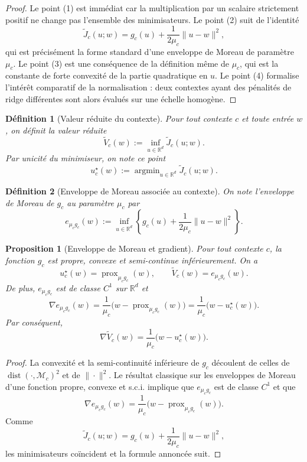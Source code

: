 \documentclass[11pt,a4paper]{article}
\newtheorem{definition}{Définition}[section]
\newtheorem{proposition}{Proposition}[section]
\DeclareMathOperator{\prox}{prox}
\DeclareMathOperator{\argmin}{argmin}
\DeclareMathOperator{\dist}{dist}
\newcommand{\R}{\mathbb R}
\newcommand{\Mcal}{\mathcal M}
\begin{document}
\begin{proof}
Le point (1) est immédiat car la multiplication par un scalaire strictement positif ne change pas l'ensemble des minimisateurs. Le point (2) suit de l'identité
\[
\widetilde J_c(u;w)=g_c(u)+\frac{1}{2\mu_c}\|u-w\|^2,
\]
qui est précisément la forme standard d'une enveloppe de Moreau de paramètre \(\mu_c\). Le point (3) est une conséquence de la définition même de \(\mu_c\), qui est la constante de forte convexité de la partie quadratique en \(u\). Le point (4) formalise l'intérêt comparatif de la normalisation : deux contextes ayant des pénalités de ridge différentes sont alors évalués sur une échelle homogène.
\end{proof}

\begin{definition}[Valeur réduite du contexte]
Pour tout contexte \(c\) et toute entrée \(w\), on définit la valeur réduite
\[
\widetilde V_c(w)
:=
\inf_{u\in\R^d}\widetilde J_c(u;w).
\]
Par unicité du minimiseur, on note ce point
\[
u_c^\star(w):=\argmin_{u\in\R^d}\widetilde J_c(u;w).
\]
\end{definition}

\begin{definition}[Enveloppe de Moreau associée au contexte]
On note l'enveloppe de Moreau de \(g_c\) au paramètre \(\mu_c\) par
\[
e_{\mu_c g_c}(w)
:=
\inf_{u\in\R^d}
\left\{
g_c(u)+\frac{1}{2\mu_c}\|u-w\|^2
\right\}.
\]
\end{definition}

\begin{proposition}[Enveloppe de Moreau et gradient]
Pour tout contexte \(c\), la fonction \(g_c\) est propre, convexe et semi-continue inférieurement. On a
\[
u_c^\star(w)=\prox_{\mu_c g_c}(w),
\qquad
\widetilde V_c(w)=e_{\mu_c g_c}(w).
\]
De plus, \(e_{\mu_c g_c}\) est de classe \(C^1\) sur \(\R^d\) et
\[
\nabla e_{\mu_c g_c}(w)=\frac{1}{\mu_c}\bigl(w-\prox_{\mu_c g_c}(w)\bigr)
=\frac{1}{\mu_c}\bigl(w-u_c^\star(w)\bigr).
\]
Par conséquent,
\[
\nabla \widetilde V_c(w)=\frac{1}{\mu_c}\bigl(w-u_c^\star(w)\bigr).
\]
\end{proposition}

\begin{proof}
La convexité et la semi-continuité inférieure de \(g_c\) découlent de celles de \(\dist(\cdot,\Mcal_c)^2\) et de \(\|\cdot\|^2\). Le résultat classique sur les enveloppes de Moreau d'une fonction propre, convexe et s.c.i. implique que \(e_{\mu_c g_c}\) est de classe \(C^1\) et que
\[
\nabla e_{\mu_c g_c}(w)=\frac{1}{\mu_c}\bigl(w-\prox_{\mu_c g_c}(w)\bigr).
\]
Comme
\[
\widetilde J_c(u;w)=g_c(u)+\frac{1}{2\mu_c}\|u-w\|^2,
\]
les minimisateurs coïncident et la formule annoncée suit.
\end{proof}
\end{document}
